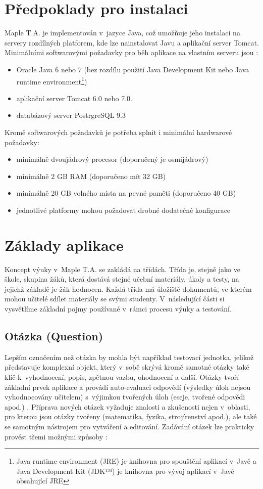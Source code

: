 \documentclass[
print,
  11pt,
  table,   
  nolof,    
  nolot,
  oneside,
  draft
]{fithesis3}
\begin{document}
	\section{Předpoklady pro instalaci}
Maple T.A. je implementován v~jazyce Java, což umožňuje jeho instalaci na servery rozdílných platforem, kde lze nainstalovat Javu a aplikační server Tomcat. Minimálními softwarovými požadavky pro běh aplikace na vlastním serveru jsou \cite{mapletarequirements}:
\begin{itemize}
	\item Oracle Java 6 nebo 7 (bez rozdílu použití Java Development Kit nebo Java runtime environment\footnote{Java runtime environment (JRE) je knihovna pro spouštění aplikací v~Javě a Java Development Kit (JDK™) je knihovna pro vývoj aplikací v~Javě obsahující JRE})
	\item aplikační server Tomcat 6.0 nebo 7.0.
	\item databázový server PostrgreSQL 9.3
\end{itemize}

Kromě softwarových požadavků je potřeba splnit i minimální hardwarové požadavky:
\begin{itemize}
	\item minimálně dvoujádrový procesor (doporučený je osmijádrový)
	\item minimálně 2 GB RAM (doporučeno mít 32 GB)
	\item minimálně 20 GB volného místa na pevné paměti (doporučeno 40 GB)
	\item jednotlivé platformy mohou požadovat drobné dodatečné konfigurace
\end{itemize}
	\section{Základy aplikace}
Koncept výuky v~Maple T.A. se zakládá na třídách. Třída je, stejně jako ve škole, skupina žáků, která dostává stejné učební materiály, úkoly a testy, na jejichž základě je žák hodnocen. Každá třída má úložiště dokumentů, ve kterém mohou učitelé sdílet materiály se svými studenty. V~následující části si vysvětlíme základní pojmy používané v~rámci procesu výuky a testování.
		\subsection{Otázka (Question)}
Lepším označením než otázka by mohla být například testovací jednotka, jelikož představuje komplexní objekt, který v~sobě skrývá kromě samotné otázky také klíč k~vyhodnocení, popis, zpětnou vazbu, ohodnocení a další. Otázky tvoří základní prvek aplikace a provádí auto-evaluaci odpovědí (výsledky úloh nejsou vyhodnocovány učitelem) s~výjimkou tvořených úloh (eseje, tvořené odpovědi apod.) \cite{crompton}. Příprava nových otázek vyžaduje znalosti a zkušenosti nejen v~oblasti, pro kterou jsou otázky tvořeny (matematika, fyzika, strojírenství apod.), ale také se samotným nástrojem pro vytváření a editování. Zadávání otázek lze prakticky provést třemi možnými způsoby \cite{heck2004}:
\end{document}

